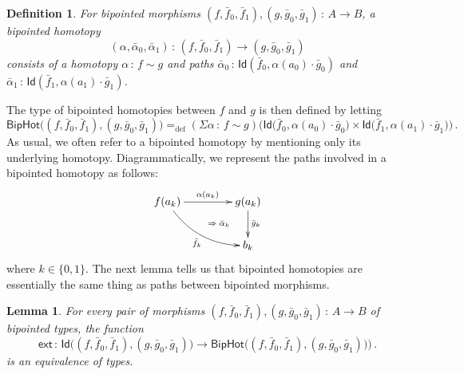 \documentclass[10pt,a4paper,oneside,reqno]{amsart}
\theoremstyle{mythm}
\newtheorem{lemma}[theorem]{Lemma}
\theoremstyle{mydef}
\newtheorem{definition}[theorem]{Definition}
\theoremstyle{myrmk}
\newcommand{\defeq}{=_{\mathrm{def}}}
\newcommand{\co}{\,{:}\,}
\newcommand{\ct}{\cdot}
\newcommand{\ext}{\mathsf{ext}}
\newcommand{\Id}{\mathsf{Id}}
\newcommand{\BipHot}{\mathsf{BipHot}}
\begin{document}
\begin{definition} \label{thm:biphomotopy} For bipointed morphisms $(f, \bar{f}_0, \bar{f}_1) , (g, \bar{g}_0, \bar{g}_1) \co A \to B$, 
a \emph{bipointed homotopy} 
\[
(\alpha, \bar{\alpha}_0, \bar{\alpha}_1) \co (f, \bar{f}_0, \bar{f}_1) \to  (g, \bar{g}_0, \bar{g}_1)
\] 
consists of a homotopy $\alpha \co  f \sim g$ and paths
$\bar{\alpha}_0 \co \Id(  \bar{f}_0 , \alpha(a_0)  \cdot \bar{g}_0)$ and $\bar{\alpha}_1 \co \Id(
\bar{f}_1 , \alpha(a_1) \cdot \bar{g}_1)$. 
\end{definition}

The type of bipointed homotopies between $f$ and $g$ is then defined by letting
\[
 \BipHot  \big( (f,\bar{f}_0, \bar{f}_1), (g, \bar{g}_0, \bar{g}_1) \big)   \defeq   
 (\Sigma \alpha \co f \sim g)  \big( 
  \Id\big( \bar{f}_0 ,  \alpha(a_0)  \ct \bar{g}_0 \big) \times 
  \Id \big( \bar{f}_1,  \alpha(a_1) \ct  \bar{g}_1 \big) \big) \, .
\]
As usual, we often refer to a bipointed homotopy by mentioning only its underlying homotopy.
Diagrammatically, we represent the paths  involved in a bipointed homotopy as follows:
\[
\xymatrix@C=1.5cm{
f(a_k) \ar[r]^{\alpha(a_k)}  \ar@/_1pc/[dr]_{\bar{f}_k}  
\ar@{}[dr]|{\qquad \Rightarrow \; \bar{\alpha}_k}  & g(a_k) \ar[d]^{\bar{g}_k}  \\ 
 & b_k }
  \] 
where $k \in \{ 0, 1\}$. The next lemma tells us that bipointed homotopies are essentially the
same thing as paths between bipointed morphisms.


\begin{lemma} \label{BoolHomSpace} 
For every  pair of morphisms $(f, \bar{f}_0, \bar{f}_1), (g, \bar{g}_0, \bar{g}_1) \co A \to B$ of bipointed types, the
function 
\[
\ext \co \Id \big( (f, \bar{f}_0, \bar{f}_1), (g, \bar{g}_0, \bar{g}_1) \big) \to 
\BipHot\big( (f, \bar{f}_0, \bar{f}_1), (g, \bar{g}_0, \bar{g}_1) ) \big) \, .
\]
is an equivalence of types.
\end{lemma}
\end{document}
